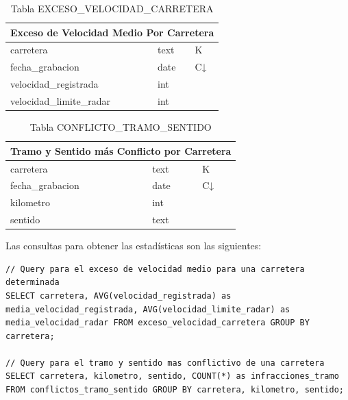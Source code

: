 \documentclass[]{article}
\begin{document}
\begin{itemize}
    \begin{table}[H]
        \centering
        \begin{tabular}{lll} 
            \toprule
            \multicolumn{3}{c}{\large\textbf{Exceso de Velocidad Medio Por Carretera}} \\ 
            \midrule
            carretera        & text & K\\
            fecha\_grabacion & date & C↓\\
            velocidad\_registrada & int & \\
            velocidad\_limite\_radar & int & \\
            \bottomrule
        \end{tabular}
        \caption {Tabla EXCESO\_VELOCIDAD\_CARRETERA}
    \end{table}

    \begin{table}[H]
        \centering
        \begin{tabular}{lll} 
            \toprule
            \multicolumn{3}{c}{\large\textbf{Tramo y Sentido más Conflicto por Carretera}} \\ 
            \midrule
            carretera     & text & K\\
            fecha\_grabacion & date & C↓\\
            kilometro     & int & \\
            sentido       & text& \\
            \bottomrule
        \end{tabular}
        \caption {Tabla CONFLICTO\_TRAMO\_SENTIDO}
    \end{table}

    Las consultas para obtener las estadísticas son las siguientes:

    \begin{lstlisting}[language=cql, caption=Consultas para el caso de uso 2]
// Query para el exceso de velocidad medio para una carretera determinada
SELECT carretera, AVG(velocidad_registrada) as media_velocidad_registrada, AVG(velocidad_limite_radar) as media_velocidad_radar FROM exceso_velocidad_carretera GROUP BY carretera;

// Query para el tramo y sentido mas conflictivo de una carretera
SELECT carretera, kilometro, sentido, COUNT(*) as infracciones_tramo FROM conflictos_tramo_sentido GROUP BY carretera, kilometro, sentido;
    \end{lstlisting}


\end{itemize}
\end{document}
